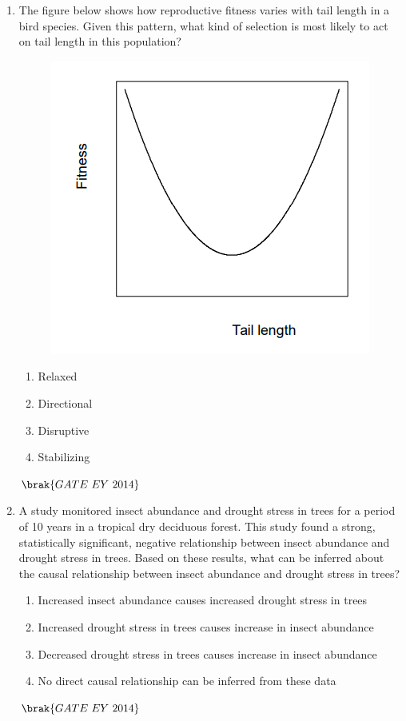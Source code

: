 \documentclass[journal]{IEEEtran}
\numberwithin{equation}{enumi}
\numberwithin{figure}{enumi}
\begin{document}
\begin{enumerate}
    \item The figure below shows how reproductive fitness varies with tail length in a bird species. Given this pattern, what kind of selection is most likely to act on tail length in this population?
    \begin{figure}[H]
    \centering
    \includegraphics[width=0.7\columnwidth]{figs/17.png}
    \caption{}
    \label{fig:17}
   \end{figure}
    \begin{multicols}{4}
    \begin{enumerate}
        \item Relaxed
        \item Directional
        \item Disruptive
        \item Stabilizing
    \end{enumerate}
    \end{multicols}
    \hfill{$\brak{ GATE\ EY\ 2014}$}
    \bigskip

    \item A study monitored insect abundance and drought stress in trees for a period of 10 years in a tropical dry deciduous forest. This study found a strong, statistically significant, negative relationship between insect abundance and drought stress in trees. Based on these results, what can be inferred about the causal relationship between insect abundance and drought stress in trees?
    \begin{enumerate}
        \item Increased insect abundance causes increased drought stress in trees
        \item Increased drought stress in trees causes increase in insect abundance
        \item Decreased drought stress in trees causes increase in insect abundance
        \item No direct causal relationship can be inferred from these data
    \end{enumerate}
    \hfill{$\brak{ GATE\ EY\ 2014}$}
    \bigskip


\end{enumerate}
\end{document}
